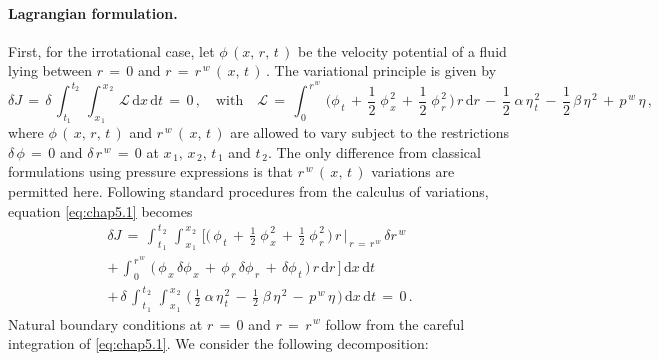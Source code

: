 \documentclass[alpha-refs, 12pt]{wiley-article}
\begin{document}
\paragraph{Lagrangian formulation.} First, for the irrotational case, let $\phi\,(x,\,r,\,t\,)$ be the velocity potential of a fluid lying between $r\,=\,0$ and $r\,=\,r^{\,w}\,(\,x,\,t\,)\,$. The variational principle \citep{Luke1967} is given by
\begin{equation}\label{eq:chap5.1}
  \delta J\,=\,\delta\,\int_{\,t_{1}}^{\,t_{2}}\,\int_{\,x_{\,1}}^{\,x_{\,2}}\,\mathcal{L}\,\mathrm{d}x\,\mathrm{d}t\,=\,0\,,\quad \text{with} \quad \mathcal{L}\,=\,\int_{\,0}^{\,r^{\,w}}\,\biggl(\phi_{\,t} \,+\,\frac{1}{2}\;\phi_{\,x}^{\,2} \,+\,\frac{1}{2}\;\phi_{\,r}^{\,2}\,\biggr)\,r\,\mathrm{d}r\,-\,\frac{1}{2}\;\alpha\,\eta_{\,t}^{\,2} \,-\,\frac{1}{2}\,\beta\,\eta^{\,2}\,+\,p^{\,w}\,\eta\,,
\end{equation}
where $\phi\,(\,x,\,r,\,t\,)$ and $r^{\,w}\,(\,x,\,t\,)$ are allowed to vary subject to the restrictions $\delta\,\phi\,=\,0$ and $\delta \,r^{\,w}\,=\,0$ at $x_{\,1},\,x_{\,2},\,t_{\,1}$ and $t_{\,2}$. The only difference from classical formulations using pressure expressions is that $r^{\,w}\,(\,x,\,t\,)$ variations are permitted here. Following standard procedures from the calculus of variations, equation \eqref{eq:chap5.1} becomes
\begin{multline}
  \delta J\,=\,\int_{\,t_{\,1}}^{\,t_{\,2}}\,\int_{\,x_{\,1}}^{\,x_{\,2}}\,\Biggl[\biggl(\,\phi_{\,t}\,+\,\frac{1}{2}\;\phi_{\,x}^{\,2}\,+\,\frac{1}{2}\;\phi_{\,r}^{\,2}\,\biggr)\,r\,\biggr\vert_{\,r\,=\,r^{\,w}}\,\delta r^{\,w}
  \\[0.5em]
  +\,\int_{\,0}^{\,r^{\,w}}\,\bigl(\,\phi_{\,x}\,\delta \phi_{\,x}\,+\,\phi_{\,r}\,\delta \phi_{\,r}\,+\,\delta \phi_{\,t}\,\bigr)\,r\,\mathrm{d}r\,\Biggr]\,\mathrm{d}x\,\mathrm{d}t
  \\[0.5em]
  +\,\delta\,\int_{\,t_{\,1}}^{\,t_{\,2}}\,\int_{\,x_{\,1}}^{\,x_{\,2}}\,\biggl(\,\frac{1}{2}\;\alpha\,\eta_{\,t}^{\,2} \,-\,\frac{1}{2}\;\beta\,\eta^{\,2} \,-\,p^{\,w}\,\eta\,\biggr)\,\mathrm{d}x\,\mathrm{d}t\,=\,0\,.
\end{multline}
Natural boundary conditions at $r\,=\,0$ and $r\,=\,r^{\,w}$ follow from the careful integration of \eqref{eq:chap5.1}. We consider the following decomposition:
\end{document}
